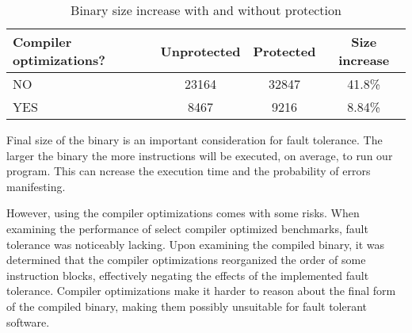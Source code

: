 \begin{table}[!h]
\centering
\begin{tabular}{|l|c|c|c|}
\hline
\textbf{Compiler optimizations?} & \textbf{Unprotected} & \textbf{Protected} & \textbf{Size increase} \\
\hline
NO  & 23164 & 32847 & 41.8\% \\
YES & 8467 & 9216 & 8.84\% \\
\hline
\end{tabular}
\caption{Binary size increase with and without protection}
\end{table}

Final size of the binary is an important consideration for fault tolerance. The larger the binary the more instructions will be executed, on average, to run our program. This can ncrease the execution time and the probability of errors manifesting.

However, using the compiler optimizations comes with some risks. When examining the performance of select compiler optimized benchmarks, fault tolerance was noticeably lacking. Upon examining the compiled binary, it was determined that the compiler optimizations reorganized the order of some instruction blocks, effectively negating the effects of the implemented fault tolerance. Compiler optimizations make it harder to reason about the final form of the compiled binary, making them possibly unsuitable for fault tolerant software.